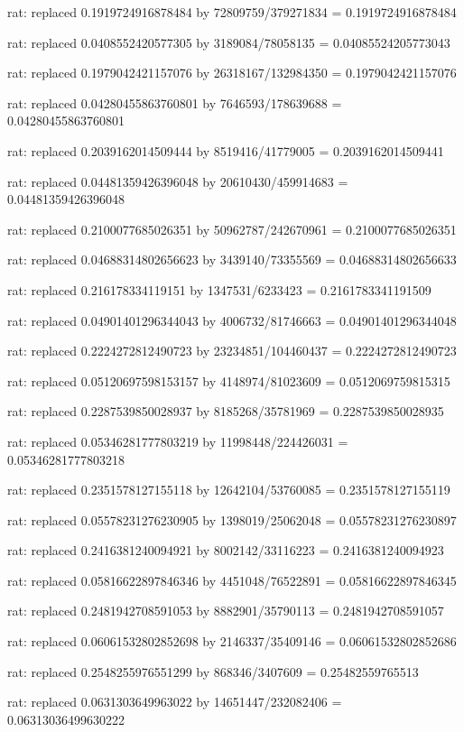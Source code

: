 \documentclass[a4paper,10pt]{article}
\begin{document}
\begin{eulernotebook}
\begin{eulercomment}
\begin{eulercomment}
\begin{eulercomment}
\begin{eulercomment}
\begin{eulercomment}
\begin{eulercomment}
\begin{eulercomment}
\begin{eulercomment}
\begin{eulercomment}
\begin{eulercomment}
\begin{eulercomment}
\begin{eulercomment}
\begin{eulercomment}
\begin{eulercomment}
\begin{eulercomment}
\begin{eulercomment}
\begin{euleroutput}
  rat: replaced 0.1919724916878484 by 72809759/379271834 = 0.1919724916878484
  
  rat: replaced 0.0408552420577305 by 3189084/78058135 = 0.04085524205773043
  
  rat: replaced 0.1979042421157076 by 26318167/132984350 = 0.1979042421157076
  
  rat: replaced 0.04280455863760801 by 7646593/178639688 = 0.04280455863760801
  
  rat: replaced 0.2039162014509444 by 8519416/41779005 = 0.2039162014509441
  
  rat: replaced 0.04481359426396048 by 20610430/459914683 = 0.04481359426396048
  
  rat: replaced 0.2100077685026351 by 50962787/242670961 = 0.2100077685026351
  
  rat: replaced 0.04688314802656623 by 3439140/73355569 = 0.04688314802656633
  
  rat: replaced 0.216178334119151 by 1347531/6233423 = 0.2161783341191509
  
  rat: replaced 0.04901401296344043 by 4006732/81746663 = 0.04901401296344048
  
  rat: replaced 0.2224272812490723 by 23234851/104460437 = 0.2224272812490723
  
  rat: replaced 0.05120697598153157 by 4148974/81023609 = 0.0512069759815315
  
  rat: replaced 0.2287539850028937 by 8185268/35781969 = 0.2287539850028935
  
  rat: replaced 0.05346281777803219 by 11998448/224426031 = 0.05346281777803218
  
  rat: replaced 0.2351578127155118 by 12642104/53760085 = 0.2351578127155119
  
  rat: replaced 0.05578231276230905 by 1398019/25062048 = 0.05578231276230897
  
  rat: replaced 0.2416381240094921 by 8002142/33116223 = 0.2416381240094923
  
  rat: replaced 0.05816622897846346 by 4451048/76522891 = 0.05816622897846345
  
  rat: replaced 0.2481942708591053 by 8882901/35790113 = 0.2481942708591057
  
  rat: replaced 0.06061532802852698 by 2146337/35409146 = 0.06061532802852686
  
  rat: replaced 0.2548255976551299 by 868346/3407609 = 0.25482559765513
  
  rat: replaced 0.0631303649963022 by 14651447/232082406 = 0.06313036499630222
  

\end{euleroutput}
\end{eulercomment}
\end{eulercomment}
\end{eulercomment}
\end{eulercomment}
\end{eulercomment}
\end{eulercomment}
\end{eulercomment}
\end{eulercomment}
\end{eulercomment}
\end{eulercomment}
\end{eulercomment}
\end{eulercomment}
\end{eulercomment}
\end{eulercomment}
\end{eulercomment}
\end{eulercomment}
\end{eulernotebook}
\end{document}
